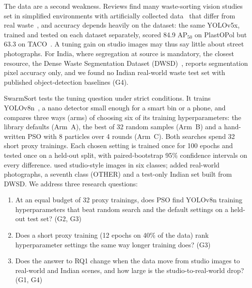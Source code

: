The data are a second weakness. Reviews find many waste-sorting vision studies set in simplified environments with artificially collected data~\cite{lu2022computer} that differ from real waste~\cite{fang2023artificial}, and accuracy depends heavily on the dataset: the same YOLOv5x, trained and tested on each dataset separately, scored 84.9 AP$_{50}$ on PlastOPol but 63.3 on TACO~\cite{cordova2022litter}. A tuning gain on studio images may thus say little about street photographs. For India, where segregation at source is mandatory, the closest resource, the Dense Waste Segmentation Dataset (DWSD)~\cite{ali2025dwsd}, reports segmentation pixel accuracy only, and we found no Indian real-world waste test set with published object-detection baselines (G4).

SwarmSort tests the tuning question under strict conditions. It trains YOLOv8n~\cite{jocher2023ultralytics}, a nano detector small enough for a smart bin or a phone, and compares three ways (arms) of choosing six of its training hyperparameters: the library defaults (Arm~A), the best of 32 random samples (Arm~B) and a hand-written PSO with 8 particles over 4 rounds (Arm~C). Both searches spend 32 short proxy trainings. Each chosen setting is trained once for 100 epochs and tested once on a held-out split, with paired-bootstrap 95\% confidence intervals on every difference. \genone used studio-style images in six classes; \gentwo added real-world photographs, a seventh class (OTHER) and a test-only Indian set built from DWSD. We address three research questions:
\begin{enumerate}
\item[RQ1:] At an equal budget of 32 proxy trainings, does PSO find YOLOv8n training hyperparameters that beat random search and the default settings on a held-out test set? (G2, G3)
\item[RQ2:] Does a short proxy training (12 epochs on 40\% of the data) rank hyperparameter settings the same way longer training does? (G3)
\item[RQ3:] Does the answer to RQ1 change when the data move from studio images to real-world and Indian scenes, and how large is the studio-to-real-world drop? (G1, G4)
\end{enumerate}


